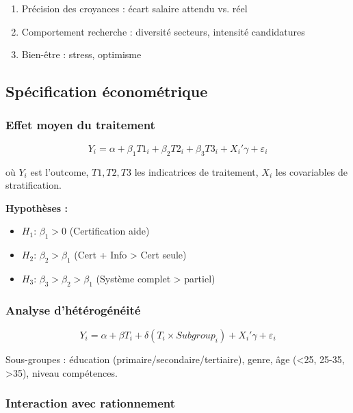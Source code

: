 \documentclass[12pt]{article}
\begin{document}
\begin{enumerate}
    \item Précision des croyances : écart salaire attendu vs. réel
    \item Comportement recherche : diversité secteurs, intensité candidatures
    \item Bien-être : stress, optimisme
\end{enumerate}

\subsection{Spécification économétrique}

\subsubsection{Effet moyen du traitement}

\begin{equation}
Y_i = \alpha + \beta_1 T1_i + \beta_2 T2_i + \beta_3 T3_i + X_i'\gamma + \varepsilon_i
\end{equation}

où $Y_i$ est l'outcome, $T1, T2, T3$ les indicatrices de traitement, $X_i$ les covariables de stratification.

\textbf{Hypothèses :}
\begin{itemize}
    \item $H_1$: $\beta_1 > 0$ (Certification aide)
    \item $H_2$: $\beta_2 > \beta_1$ (Cert + Info > Cert seule)
    \item $H_3$: $\beta_3 > \beta_2 > \beta_1$ (Système complet > partiel)
\end{itemize}

\subsubsection{Analyse d'hétérogénéité}

\begin{equation}
Y_i = \alpha + \beta T_i + \delta (T_i \times Subgroup_i) + X_i'\gamma + \varepsilon_i
\end{equation}

Sous-groupes : éducation (primaire/secondaire/tertiaire), genre, âge (<25, 25-35, >35), niveau compétences.

\subsubsection{Interaction avec rationnement}
\end{document}
